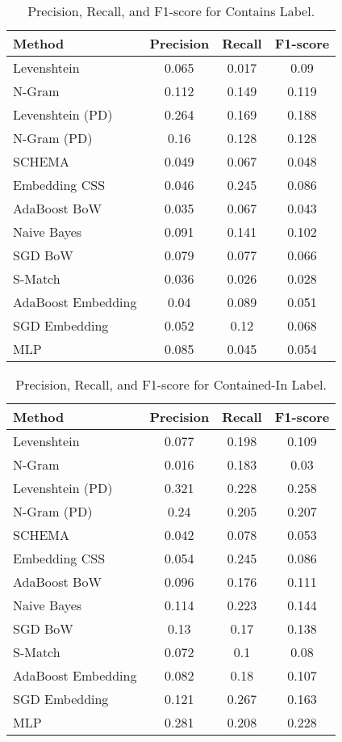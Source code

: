 \begin{table}[htbp]
 \begin{center}
  \begin{tabular}{l|ccc}
   Method & Precision & Recall & F1-score \\
   \hline
   Levenshtein & 0.065 & 0.017 & 0.09 \\
   N-Gram & 0.112 & 0.149 & 0.119 \\
   Levenshtein (PD) & 0.264 & 0.169 & 0.188 \\
   N-Gram (PD) & 0.16 & 0.128 & 0.128 \\
   SCHEMA & 0.049 & 0.067 & 0.048 \\
   Embedding CSS & 0.046 & 0.245 & 0.086 \\
   AdaBoost BoW & 0.035 & 0.067 & 0.043 \\
   Naive Bayes & 0.091 & 0.141 & 0.102 \\
   SGD BoW & 0.079 & 0.077 & 0.066 \\
   S-Match & 0.036 & 0.026 & 0.028 \\
   AdaBoost Embedding & 0.04 & 0.089 & 0.051 \\
   SGD Embedding & 0.052 & 0.12 & 0.068 \\
   MLP & 0.085 & 0.045 & 0.054 \\
  \end{tabular}
  \caption{Precision, Recall, and F1-score for Contains Label.}
  \label{tab:contains-results}
 \end{center}
\end{table}

\begin{table}[htbp]
 \begin{center}
  \begin{tabular}{l|ccc}
   Method & Precision & Recall & F1-score \\
   \hline
   Levenshtein & 0.077 & 0.198 & 0.109 \\
   N-Gram & 0.016 & 0.183 & 0.03 \\
   Levenshtein (PD) & 0.321 & 0.228 & 0.258 \\
   N-Gram (PD) & 0.24 & 0.205 & 0.207 \\
   SCHEMA & 0.042 & 0.078 & 0.053 \\
   Embedding CSS & 0.054 & 0.245 & 0.086 \\
   AdaBoost BoW & 0.096 & 0.176 & 0.111 \\
   Naive Bayes & 0.114 & 0.223 & 0.144 \\
   SGD BoW & 0.13 & 0.17 & 0.138 \\
   S-Match & 0.072 & 0.1 & 0.08 \\
   AdaBoost Embedding & 0.082 & 0.18 & 0.107 \\
   SGD Embedding & 0.121 & 0.267 & 0.163 \\
   MLP & 0.281 & 0.208 & 0.228 \\
  \end{tabular}
  \caption{Precision, Recall, and F1-score for Contained-In Label.}
  \label{tab:contained-in-results}
 \end{center}
\end{table}

